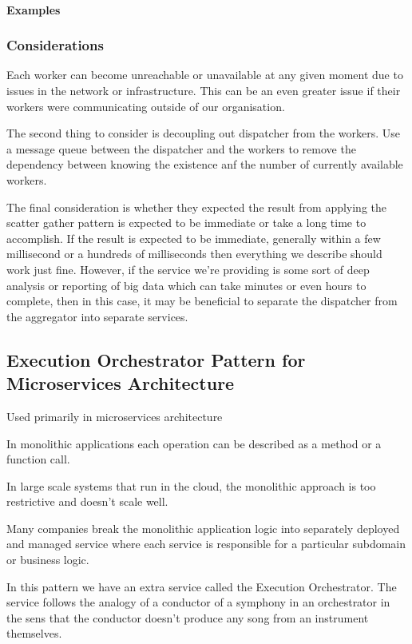 \paragraph{Examples}

\subsubsection{Considerations}

Each worker can become unreachable or unavailable at any given moment due to issues in the network or infrastructure.
This can be an even greater issue if their workers were communicating outside of our organisation.

The second thing to consider is decoupling out dispatcher from the workers.
Use a message queue between the dispatcher and the workers to remove the dependency between knowing the existence anf the number of currently available workers.

The final consideration is whether they expected the result from applying the scatter gather pattern is expected to be immediate or take a long time to accomplish.
If the result is expected to be immediate, generally within a few millisecond or a hundreds of milliseconds then everything we describe should work just fine.
However, if the service we're providing is some sort of deep analysis or reporting of big data which can take minutes or even hours to complete, then in this case, it may be beneficial to separate the dispatcher from the aggregator into separate services.

\subsection{Execution Orchestrator Pattern for Microservices Architecture}
Used primarily in microservices architecture

In monolithic applications each operation can be described as a method or a function call.

In large scale systems that run in the cloud, the monolithic approach is too restrictive and doesn't scale well.

Many companies break the monolithic application logic into separately deployed and managed service where each service is responsible for a particular subdomain or business logic.

In this pattern we have an extra service called the Execution Orchestrator.
The service follows the analogy of a conductor of a symphony in an orchestrator in the sens that the conductor doesn't produce any song from an instrument themselves.

